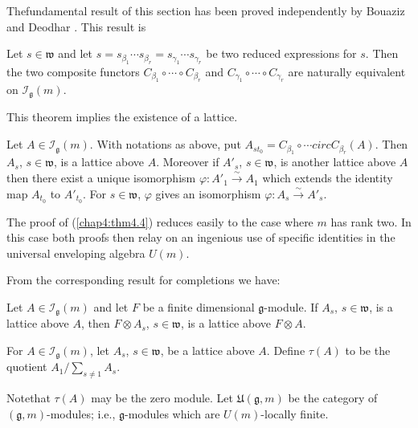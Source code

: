 The\pageoriginale fundamental result of this section has been proved
independently by Bouaziz \cite{key5} and Deodhar \cite{key7}. This
result is 

\begin{theorem}\label{chap4:thm4.4}
Let $s \in \mathfrak{w}$ and let $s = s_{\beta_1} \cdots s_{\beta_r}
= s_{\gamma_1} \cdots s_{\gamma_r}$ be two reduced expressions for
$s$. Then the two composite functors $C_{\beta_1} \circ \cdots  \circ
C_{\beta_r}$ and $C_{\gamma_1} \circ \cdots \circ C_{\gamma_r}$ are
naturally equivalent on $\mathscr{I}_\mathfrak{g}(m)$.
\end{theorem}

This theorem implies the existence of a lattice.

\begin{coro}\label{chap4:coro4.5}
Let $A \in \mathscr{I}_\mathfrak{g}(m)$. With notations as above, put
$A_{st_0} = C_{\beta_1} \circ \cdots circ C_{\beta_r}(A)$. Then $A_s$,
$s \in \mathfrak{w}$, is a lattice above $A$. Moreover if $A'_s$, $s
\in \mathfrak{w}$, is another lattice above $A$ then there exist a
unique isomorphism $\varphi: A'_1 \xrightarrow{\sim} A_1$ which
extends the identity map $A_{t_0}$ to $A'_{t_0}$. For $s \in
\mathfrak{w}$, $\varphi$ gives an isomorphism $\varphi: A_s
\xrightarrow{\sim} A'_s$.
\end{coro}

The proof of (\ref{chap4:thm4.4}) reduces easily to the case where $m$ has rank
two. In this case both proofs then relay on an ingenious use of
specific identities in the universal enveloping algebra $U(m)$.

From the corresponding result for completions we have:

\begin{prop}\label{chap4:prop4.6}
Let $A \in \mathscr{I}_\mathfrak{g}(m)$ and let $F$ be a finite
dimensional $\mathfrak{g}$-module. If $A_s$, $s \in \mathfrak{w}$, is
a lattice above $A$, then $F \otimes A_s$, $s \in \mathfrak{w}$, is a
lattice above $F\otimes A$. 
\end{prop}

\begin{definition}\label{chap4:def4.7}
For $A \in \mathscr{I}_\mathfrak{g}(m)$, let $A_s$, $s \in
\mathfrak{w}$, be a lattice above $A$. Define $\tau(A)$ to be the
quotient $A_1/ \sum\limits_{s\neq 1}A_s$.
\end{definition}

Note\pageoriginale that $\tau(A)$ may be the zero module. Let
$\mathfrak{U}(\mathfrak{g}, m)$ be the category of
$(\mathfrak{g},m)$-modules; i.e., $\mathfrak{g}$-modules which are
$U(m)$-locally finite.

